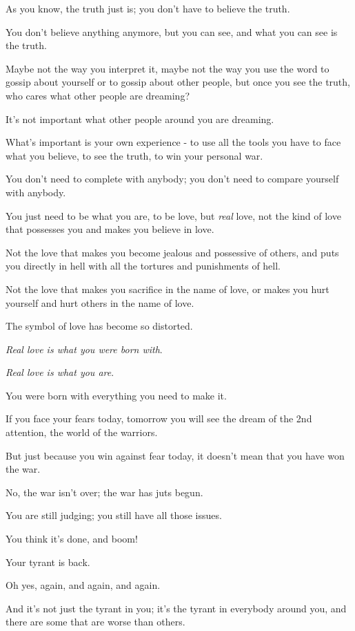 \documentclass{article}
\numberwithin{equation}{section}
\begin{document}
As you know, the truth just is; you don't have to believe the truth.

You don't believe anything anymore, but you can see, and what you can see is the truth.


Maybe not the way you interpret it, maybe not the way you use the word to gossip about yourself or to gossip about other people, but once you see the truth, who cares what other people are dreaming?

It's not important what other people around you are dreaming.

What's important is your own experience - to use all the tools you have to face what you believe, to see the truth, to win your personal war.

%
You don't need to complete with anybody; you don't need to compare yourself with anybody.

You just need to be what you are, to be love, but \textit{real} love, not the kind of love that possesses you and makes you believe in love.

Not the love that makes you become jealous and possessive of others, and puts you directly in hell with all the tortures and punishments of hell.

Not the love that makes you sacrifice in the name of love, or makes you hurt yourself and hurt others in the name of love.

The symbol of love has become so distorted.

\textit{Real love is what you were born with}.

\textit{Real love is what you are}.

%
You were born with everything you need to make it.

If you face your fears today, tomorrow you will see the dream of the 2nd attention, the world of the warriors.

But just because you win against fear today, it doesn't mean that you have won the war.

No, the war isn't over; the war has juts begun.

You are still judging; you still have all those issues.

You think it's done, and boom!

Your tyrant is back.

Oh yes, again, and again, and again.

And it's not just the tyrant in you; it's the tyrant in everybody around you, and there are some that are worse than others.
\end{document}
